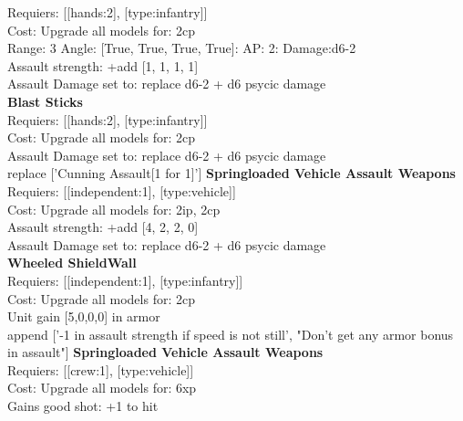 Requiers: [[hands:2], [type:infantry]] \\
Cost: Upgrade all models for: 2cp \\


Range: 3  Angle: [True, True, True, True]: AP: 2: Damage:d6-2 \\




Assault strength: +add [1, 1, 1, 1] 
\\ 
Assault Damage set to: replace d6-2 + d6 psycic damage
\\ 


{\bf Blast Sticks } \\

Requiers: [[hands:2], [type:infantry]] \\
Cost: Upgrade all models for: 2cp \\





Assault Damage set to: replace d6-2 + d6 psycic damage
\\ 

replace ['Cunning Assault[1 for 1]']
{\bf Springloaded Vehicle Assault Weapons } \\

Requiers: [[independent:1], [type:vehicle]] \\
Cost: Upgrade all models for: 2ip, 2cp \\





Assault strength: +add [4, 2, 2, 0] 
\\ 
Assault Damage set to: replace d6-2 + d6 psycic damage
\\ 


{\bf Wheeled ShieldWall } \\

Requiers: [[independent:1], [type:infantry]] \\
Cost: Upgrade all models for: 2cp \\
Unit gain [5,0,0,0] in armor\\ 






append ['-1 in assault strength if speed is not still', "Don't get any armor bonus in assault"]
{\bf Springloaded Vehicle Assault Weapons } \\

Requiers: [[crew:1], [type:vehicle]] \\
Cost: Upgrade all models for: 6xp \\
Gains good shot: +1 to hit\\ 







